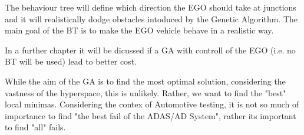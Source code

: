 The behaviour tree will define which direction the EGO should take at junctions and it will realistically dodge obstacles intoduced by the Genetic Algorithm. The main goal of the BT is to make the EGO vehicle behave in a realistic way.

In a further chapter it will be dicussed if a GA with controll of the EGO (i.e. no BT will be used) lead to better cost.

While the aim of the GA is to find the most optimal solution, considering the vastness of the hyperspace, this is unlikely. Rather, we want to find the "best" local minimas. Considering the contex of Automotive testing, it is not so much of importance to find "the best fail of the ADAS/AD System", rather its important to find "all" fails.







